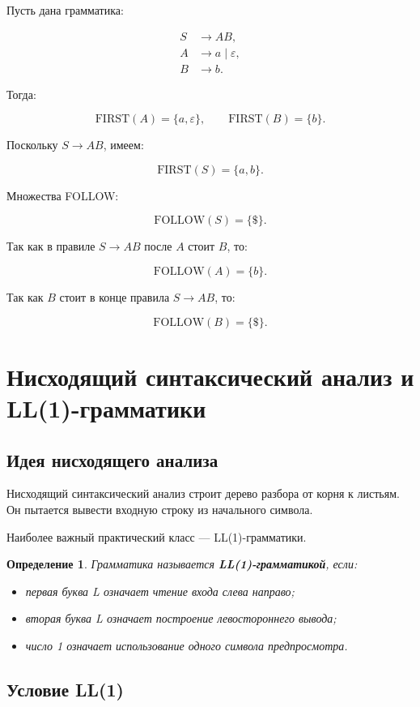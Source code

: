 \documentclass[12pt,a4paper]{article}
\newtheorem{definition}{Определение}
\begin{document}
Пусть дана грамматика:

\[
\begin{aligned}
S &\to AB,\\
A &\to a \mid \varepsilon,\\
B &\to b.
\end{aligned}
\]

Тогда:

\[
\mathrm{FIRST}(A)=\{a,\varepsilon\},
\qquad
\mathrm{FIRST}(B)=\{b\}.
\]

Поскольку $S \to AB$, имеем:

\[
\mathrm{FIRST}(S)=\{a,b\}.
\]

Множества FOLLOW:

\[
\mathrm{FOLLOW}(S)=\{\$\}.
\]

Так как в правиле $S \to AB$ после $A$ стоит $B$, то:

\[
\mathrm{FOLLOW}(A)=\{b\}.
\]

Так как $B$ стоит в конце правила $S \to AB$, то:

\[
\mathrm{FOLLOW}(B)=\{\$\}.
\]

\section{Нисходящий синтаксический анализ и LL(1)-грамматики}

\subsection{Идея нисходящего анализа}

Нисходящий синтаксический анализ строит дерево разбора от корня к листьям. Он пытается вывести входную строку из начального символа.

Наиболее важный практический класс --- LL(1)-грамматики.

\begin{definition}
Грамматика называется \textbf{LL(1)-грамматикой}, если:
\begin{itemize}
    \item первая буква L означает чтение входа слева направо;
    \item вторая буква L означает построение левостороннего вывода;
    \item число 1 означает использование одного символа предпросмотра.
\end{itemize}
\end{definition}

\subsection{Условие LL(1)}
\end{document}
